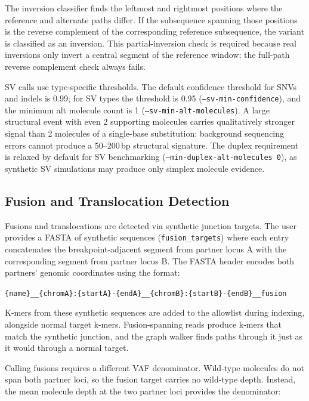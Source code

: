 The inversion classifier finds the leftmost and rightmost positions where the reference and alternate paths differ. If the subsequence spanning those positions is the reverse complement of the corresponding reference subsequence, the variant is classified as an inversion. This partial-inversion check is required because real inversions only invert a central segment of the reference window; the full-path reverse complement check always fails.

SV calls use type-specific thresholds. The default confidence threshold for SNVs and indels is 0.99; for SV types the threshold is 0.95 (\texttt{--sv-min-confidence}), and the minimum alt molecule count is 1 (\texttt{--sv-min-alt-molecules}). A large structural event with even 2 supporting molecules carries qualitatively stronger signal than 2 molecules of a single-base substitution: background sequencing errors cannot produce a 50--200\,bp structural signature. The duplex requirement is relaxed by default for SV benchmarking (\texttt{--min-duplex-alt-molecules 0}), as synthetic SV simulations may produce only simplex molecule evidence.

\subsection{Fusion and Translocation Detection}
\label{sec:method:fusion}

Fusions and translocations are detected via synthetic junction targets. The user provides a FASTA of synthetic sequences (\texttt{fusion\_targets}) where each entry concatenates the breakpoint-adjacent segment from partner locus A with the corresponding segment from partner locus B. The FASTA header encodes both partners' genomic coordinates using the format:

\begin{center}
\texttt{\{name\}\_\_\{chromA\}:\{startA\}-\{endA\}\_\_\{chromB\}:\{startB\}-\{endB\}\_\_fusion}
\end{center}

K-mers from these synthetic sequences are added to the allowlist during indexing, alongside normal target k-mers. Fusion-spanning reads produce k-mers that match the synthetic junction, and the graph walker finds paths through it just as it would through a normal target.

Calling fusions requires a different VAF denominator. Wild-type molecules do not span both partner loci, so the fusion target carries no wild-type depth. Instead, the mean molecule depth at the two partner loci provides the denominator:

